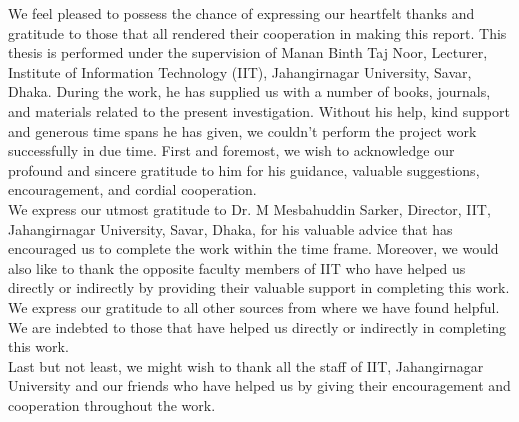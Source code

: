 We feel pleased to possess the chance of expressing our heartfelt thanks and gratitude to those that all rendered their cooperation in making this report. This thesis is performed under the supervision of Manan Binth Taj Noor, Lecturer, Institute of Information Technology (IIT), Jahangirnagar University, Savar, Dhaka. During the work, he has supplied us with a number of books, journals, and materials related to the present investigation. Without his help, kind support and generous time spans he has given, we couldn't perform the project work successfully in due time. First and foremost, we wish to acknowledge our profound
and sincere gratitude to him for his guidance, valuable suggestions, encouragement, and cordial cooperation. \\
We express our utmost gratitude to Dr. M Mesbahuddin Sarker, Director, IIT, Jahangirnagar University, Savar, Dhaka, for his valuable advice that has encouraged us to complete the work within the time frame. Moreover, we would also like to thank the opposite faculty members of IIT who have helped us directly or indirectly by providing their valuable support in completing this work. We express our gratitude to all other sources from where we have found helpful. We are indebted to those that have helped us directly or indirectly in completing this work.\\
Last but not least, we might wish to thank all the staff of IIT, Jahangirnagar University and our friends who have helped us by giving their encouragement and cooperation throughout the work.
